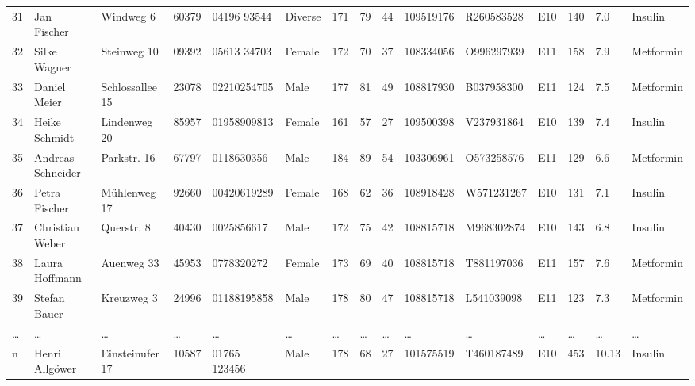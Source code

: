\begin{table}
\begin{longtable}{lllllllllllllll}
    31 & Jan Fischer & Windweg 6 & 60379 & 04196 93544 & Diverse & 171 & 79 & 44 & 109519176 & R260583528 & E10 & 140 & 7.0 & Insulin \\
    32 & Silke Wagner & Steinweg 10 & 09392 & 05613 34703 & Female & 172 & 70 & 37 & 108334056 & O996297939 & E11 & 158 & 7.9 & Metformin \\
    33 & Daniel Meier & Schlossallee 15 & 23078 & 02210254705 & Male & 177 & 81 & 49 & 108817930 & B037958300 & E11 & 124 & 7.5 & Metformin \\
    34 & Heike Schmidt & Lindenweg 20 & 85957 & 01958909813 & Female & 161 & 57 & 27 & 109500398 & V237931864 & E10 & 139 & 7.4 & Insulin \\
    35 & Andreas Schneider & Parkstr. 16 & 67797 & 0118630356 & Male & 184 & 89 & 54 & 103306961 & O573258576 & E11 & 129 & 6.6 & Metformin \\
    36 & Petra Fischer & Mühlenweg 17 & 92660 & 00420619289 & Female & 168 & 62 & 36 & 108918428 & W571231267 & E10 & 131 & 7.1 & Insulin \\
    37 & Christian Weber & Querstr. 8 & 40430 & 0025856617 & Male & 172 & 75 & 42 & 108815718 & M968302874 & E10 & 143 & 6.8 & Insulin \\
    38 & Laura Hoffmann & Auenweg 33 & 45953 & 0778320272 & Female & 173 & 69 & 40 & 108815718 & T881197036 & E11 & 157 & 7.6 & Metformin \\
    39 & Stefan Bauer & Kreuzweg 3 & 24996 & 01188195858 & Male & 178 & 80 & 47 & 108815718 & L541039098 & E11 & 123 & 7.3 & Metformin \\
    \dots & \dots & \dots & \dots & \dots & \dots & \dots & \dots & \dots & \dots & \dots & \dots & \dots & \dots & \dots \\
    n & Henri Allgöwer & Einsteinufer 17 & 10587 & 01765 123456 & Male & 178 & 68 & 27 & 101575519 & T460187489 & E10 & 453 & 10.13 & Insulin \\

    \end{longtable}    
\end{table}

\begin{figure}
    \label{table:anonymizers_parameters}
\end{figure}

\begin{figure}
    \label{fig:full_class_diagram}
\end{figure}


